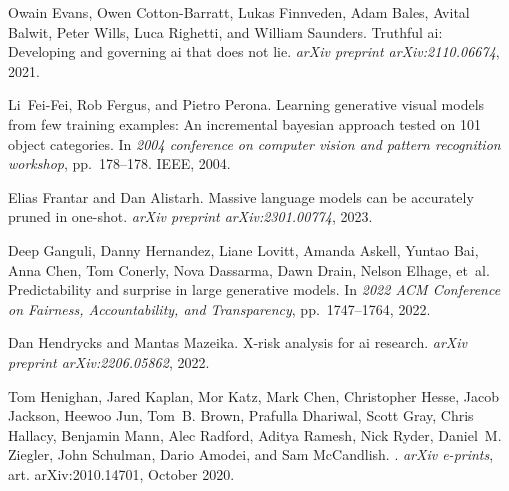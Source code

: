 \documentclass{article} %
\begin{document}
\begin{thebibliography}{61}
Owain Evans, Owen Cotton-Barratt, Lukas Finnveden, Adam Bales, Avital Balwit,
  Peter Wills, Luca Righetti, and William Saunders.
\newblock Truthful ai: Developing and governing ai that does not lie.
\newblock \emph{arXiv preprint arXiv:2110.06674}, 2021.

Li~Fei-Fei, Rob Fergus, and Pietro Perona.
\newblock Learning generative visual models from few training examples: An
  incremental bayesian approach tested on 101 object categories.
\newblock In \emph{2004 conference on computer vision and pattern recognition
  workshop}, pp.\  178--178. IEEE, 2004.

Elias Frantar and Dan Alistarh.
\newblock Massive language models can be accurately pruned in one-shot.
\newblock \emph{arXiv preprint arXiv:2301.00774}, 2023.

Deep Ganguli, Danny Hernandez, Liane Lovitt, Amanda Askell, Yuntao Bai, Anna
  Chen, Tom Conerly, Nova Dassarma, Dawn Drain, Nelson Elhage, et~al.
\newblock Predictability and surprise in large generative models.
\newblock In \emph{2022 ACM Conference on Fairness, Accountability, and
  Transparency}, pp.\  1747--1764, 2022.

Dan Hendrycks and Mantas Mazeika.
\newblock X-risk analysis for ai research.
\newblock \emph{arXiv preprint arXiv:2206.05862}, 2022.

Tom {Henighan}, Jared {Kaplan}, Mor {Katz}, Mark {Chen}, Christopher {Hesse},
  Jacob {Jackson}, Heewoo {Jun}, Tom~B. {Brown}, Prafulla {Dhariwal}, Scott
  {Gray}, Chris {Hallacy}, Benjamin {Mann}, Alec {Radford}, Aditya {Ramesh},
  Nick {Ryder}, Daniel~M. {Ziegler}, John {Schulman}, Dario {Amodei}, and Sam
  {McCandlish}.
.
\newblock \emph{arXiv e-prints}, art. arXiv:2010.14701, October 2020.


\end{thebibliography}
\end{document}
